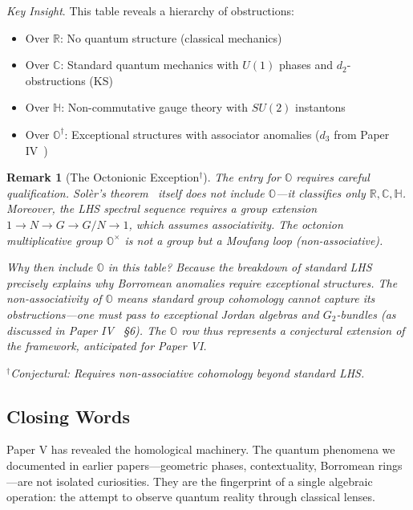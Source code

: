 \documentclass[11pt]{article}
\newtheorem{remark}[theorem]{Remark}
\begin{document}
\textit{Key Insight}.
This table reveals a hierarchy of obstructions:
\begin{itemize}
\item Over $\mathbb{R}$: No quantum structure (classical mechanics)
\item Over $\mathbb{C}$: Standard quantum mechanics with $U(1)$ phases and $d_2$-obstructions (KS)
\item Over $\mathbb{H}$: Non-commutative gauge theory with $SU(2)$ instantons
\item Over $\mathbb{O}^\dagger$: Exceptional structures with associator anomalies ($d_3$ from Paper IV~\cite{PaperIV})
\end{itemize}

\begin{remark}[The Octonionic Exception$^\dagger$]\label{rem:octonion}
The entry for $\mathbb{O}$ requires careful qualification. Sol\`{e}r's theorem~\cite{Soler1995} itself does not include $\mathbb{O}$---it classifies only $\mathbb{R}, \mathbb{C}, \mathbb{H}$. Moreover, the LHS spectral sequence requires a group extension $1 \to N \to G \to G/N \to 1$, which assumes associativity. The octonion multiplicative group $\mathbb{O}^\times$ is not a group but a Moufang loop (non-associative).

Why then include $\mathbb{O}$ in this table? Because the breakdown of standard LHS precisely explains why Borromean anomalies require exceptional structures. The non-associativity of $\mathbb{O}$ means standard group cohomology cannot capture its obstructions---one must pass to exceptional Jordan algebras and $G_2$-bundles (as discussed in Paper IV~\cite{PaperIV} \S6). The $\mathbb{O}$ row thus represents a conjectural extension of the framework, anticipated for Paper VI.
\end{remark}

$^\dagger$\textit{Conjectural: Requires non-associative cohomology beyond standard LHS.}

\subsection{Closing Words}
\label{closing}

Paper V has revealed the homological machinery. The quantum phenomena we documented in earlier papers---geometric phases, contextuality, Borromean rings---are not isolated curiosities. They are the fingerprint of a single algebraic operation: the attempt to observe quantum reality through classical lenses.
\end{document}
